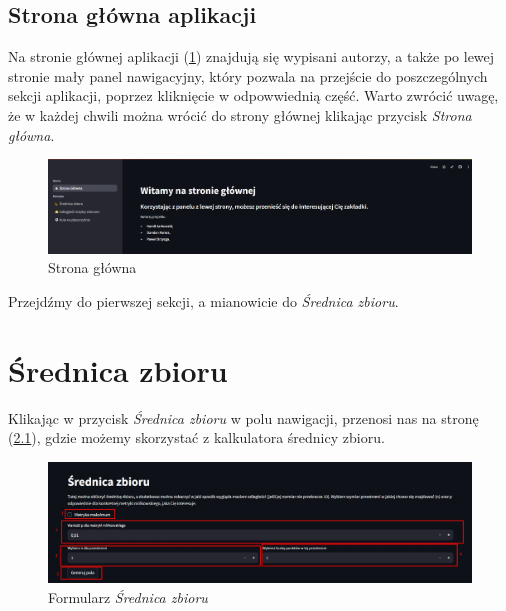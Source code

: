 \documentclass[article,11pt]{mwrep}
\begin{document}
\section{Strona główna aplikacji}

Na stronie głównej aplikacji (\ref{rys:sg}) znajdują się wypisani autorzy, a także po lewej stronie mały panel nawigacyjny, który pozwala na przejście do poszczególnych sekcji aplikacji, poprzez kliknięcie w odpowwiednią część. Warto zwrócić uwagę, że w każdej chwili można wrócić do strony głównej klikając przycisk \textit{Strona główna}. 

\begin{figure}[H] 
    \centering
    \includegraphics[width=1\textwidth]{figure/Screenshot_1.jpg}
    \caption{Strona główna}\label{rys:sg}
\end{figure}

Przejdźmy do pierwszej sekcji, a mianowicie do \textit{Średnica zbioru}.

\chapter{Średnica zbioru}

Klikając w przycisk \textit{Średnica zbioru} w polu nawigacji, przenosi nas na stronę (\ref{rys:sz}), gdzie możemy skorzystać z kalkulatora średnicy zbioru. 

\begin{figure}[H] 
    \centering
    \includegraphics[width=1\textwidth]{figure/Screenshot_2.jpg}
    \caption{Formularz \textit{Średnica zbioru}}\label{rys:sz}
\end{figure}
\end{document}
